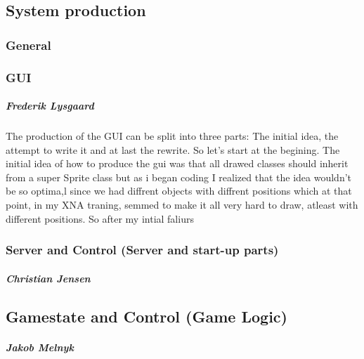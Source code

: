 \subsection{System production}
\subsubsection{General}

\subsubsection{GUI}
\subparagraph{Frederik Lysgaard}
The production of the GUI can be split into three parts: The initial idea, the attempt to write it and at last the rewrite. So let's start at the begining. The initial idea of how to produce the gui was that all drawed classes should inherit from a super Sprite class but as i began coding I realized that the idea wouldn't be so optima,l since we had diffrent objects with diffrent positions which at that point, in my XNA traning, semmed to make it all very hard to draw, atleast with different positions. So after my intial faliurs

\subsubsection{Server and Control (Server and start-up parts)}
\subparagraph{Christian Jensen}

\subsection{Gamestate and Control (Game Logic)}
\subparagraph{Jakob Melnyk}
